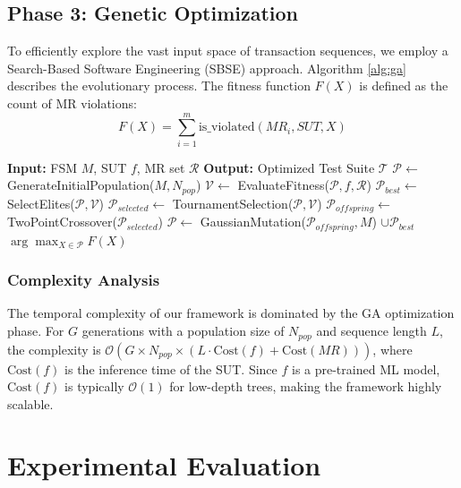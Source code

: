 \documentclass[review]{elsarticle}
\begin{document}
\subsection{Phase 3: Genetic Optimization}
To efficiently explore the vast input space of transaction sequences, we employ a Search-Based Software Engineering (SBSE) approach. Algorithm \ref{alg:ga} describes the evolutionary process. The fitness function $F(X)$ is defined as the count of MR violations:
\begin{equation}
    F(X) = \sum_{i=1}^{m} \text{is\_violated}(MR_i, SUT, X)
\end{equation}

\begin{algorithm}
\caption{Genetic Algorithm for MR Violation Discovery}
\label{alg:ga}
\begin{algorithmic}[1]
\State \textbf{Input:} FSM $M$, SUT $f$, MR set $\mathcal{R}$
\State \textbf{Output:} Optimized Test Suite $\mathcal{T}$
\State $\mathcal{P} \leftarrow$ GenerateInitialPopulation($M, N_{pop}$) 
    \State $\mathcal{V} \leftarrow$ EvaluateFitness($\mathcal{P}, f, \mathcal{R}$)
    \State $\mathcal{P}_{best} \leftarrow$ SelectElites($\mathcal{P}, \mathcal{V}$) 
    \State $\mathcal{P}_{selected} \leftarrow$ TournamentSelection($\mathcal{P}, \mathcal{V}$)
    \State $\mathcal{P}_{offspring} \leftarrow$ TwoPointCrossover($\mathcal{P}_{selected}$)
    \State $\mathcal{P} \leftarrow$ GaussianMutation($\mathcal{P}_{offspring}, M$) $\cup \mathcal{P}_{best}$
\EndFor
\State \Return $\arg\max_{X \in \mathcal{P}} F(X)$
\end{algorithmic}
\end{algorithm}

\subsubsection{Complexity Analysis}
The temporal complexity of our framework is dominated by the GA optimization phase. For $G$ generations with a population size of $N_{pop}$ and sequence length $L$, the complexity is $\mathcal{O}(G \times N_{pop} \times (L \cdot \text{Cost}(f) + \text{Cost}(MR)))$, where $\text{Cost}(f)$ is the inference time of the SUT. Since $f$ is a pre-trained ML model, $\text{Cost}(f)$ is typically $\mathcal{O}(1)$ for low-depth trees, making the framework highly scalable.

\section{Experimental Evaluation}
\label{sec:experiment}
\end{document}
